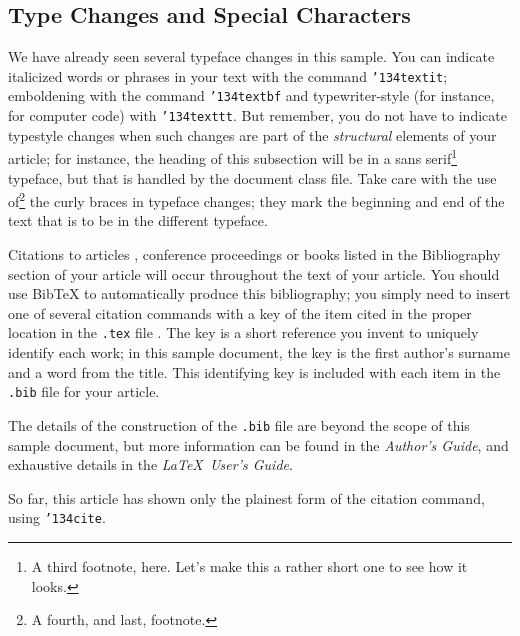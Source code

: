 \documentclass{sigkddExp}
\begin{document}
\subsection{Type Changes and Special Characters}
We have already seen several typeface changes in this sample.  You
can indicate italicized words or phrases in your text with
the command \texttt{{\char'134}textit}; emboldening with the
command \texttt{{\char'134}textbf}
and typewriter-style (for instance, for computer code) with
\texttt{{\char'134}texttt}.  But remember, you do not
have to indicate typestyle changes when such changes are
part of the \textit{structural} elements of your
article; for instance, the heading of this subsection will
be in a sans serif\footnote{A third footnote, here.
Let's make this a rather short one to
see how it looks.} typeface, but that is handled by the
document class file. Take care with the use
of\footnote{A fourth, and last, footnote.}
the curly braces in typeface changes; they mark
the beginning and end of
the text that is to be in the different typeface.

Citations to articles \cite{bowman:reasoning, clark:pct, braams:babel, herlihy:methodology},
conference
proceedings \cite{clark:pct} or books \cite{salas:calculus, Lamport:LaTeX} listed
in the Bibliography section of your
article will occur throughout the text of your article.
You should use BibTeX to automatically produce this bibliography;
you simply need to insert one of several citation commands with
a key of the item cited in the proper location in
the \texttt{.tex} file \cite{Lamport:LaTeX}.
The key is a short reference you invent to uniquely
identify each work; in this sample document, the key is
the first author's surname and a
word from the title.  This identifying key is included
with each item in the \texttt{.bib} file for your article.

The details of the construction of the \texttt{.bib} file
are beyond the scope of this sample document, but more
information can be found in the \textit{Author's Guide},
and exhaustive details in the \textit{\LaTeX\ User's
Guide}\cite{Lamport:LaTeX}.

So far, this article has shown only the plainest form
of the citation command, using \texttt{{\char'134}cite}.
%
\end{document}
